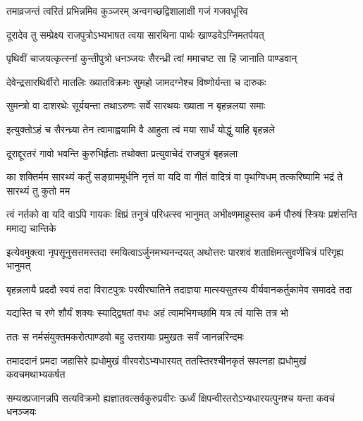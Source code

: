 \twolineshloka
{तमाव्रजन्तं त्वरितं प्रभिन्नमिव कुञ्जरम्}
{अन्वगच्छद्विशालाक्षी गजं गजवधूरिव}


\twolineshloka
{दूरादेव तु सम्प्रेक्ष्य राजपुत्रोऽभ्यभाषत}
{त्वया सारथिना पार्थः खाण्डवेऽग्निमतर्पयत्}


\twolineshloka
{पृथिवीं चाजयत्कृत्स्नां कुन्तीपुत्रो धनञ्जयः}
{सैरन्ध्री त्वां ममाचष्ट सा हि जानाति पाण्डवान्}


\twolineshloka
{देवेन्द्रसारथिर्वीरो मातलिः ख्यातविक्रमः}
{सुमहो जामदग्नेश्च विष्णोर्यन्ता च दारुकः}


\twolineshloka
{सुमन्त्रो वा दाशरथेः सूर्ययन्ता तथाऽरुणः}
{सर्वे सारथयः ख्याता न बृहन्नलया समाः}


\twolineshloka
{इत्युक्तोऽहं च सैरन्ध्र्या तेन त्वामाह्वयामि वै}
{आहुता त्वं मया सार्धं योद्धुं याहि बृहन्नले}


\twolineshloka
{दूराद्दूरतरं गावो भवन्ति कुरुभिर्हृताः}
{तथोक्ता प्रत्युवाचेदं राजपुत्रं बृहन्नला}


\threelineshloka
{का शक्तिर्मम सारथ्यं कर्तुं सङ्ग्राममूर्धनि}
{नृत्तं वा यदि वा गीतं वादित्रं वा पृथग्विधम्}
{तत्करिष्यामि भद्रं ते सारथ्यं तु कुतो मम}




\twolineshloka
{त्वं नर्तको वा यदि वाऽपि गायकः क्षिप्रं तनुत्रं परिधत्स्व भानुमत्}
{अभीक्ष्णमाहुस्तव कर्म पौरुषं स्त्रियः प्रशंसन्ति ममाद्य चान्तिके}



\twolineshloka
{इत्येवमुक्त्वा नृपसूनुसत्तमस्तदा स्मयित्वाऽर्जुनमभ्यनन्दयत्}
{अथोत्तरः पारशवं शताक्षिमत्सुवर्णचित्रं परिगृह्य भानुमत्}


\twolineshloka
{बृहन्नलायै प्रददौ स्वयं तदा विराटपुत्रः परवीरघातिने}
{तदाज्ञया मात्स्यसुतस्य वीर्यवानकर्तुकामेव समाददे तदा}




\twolineshloka
{यद्यस्ति च रणे शौर्यं शक्यः स्याद्द्विषतां वधः}
{अहं त्वामभिगच्छामि यत्र त्वं यासि तत्र भो}



\twolineshloka
{ततः स नर्मसंयुक्तमकरोत्पाण्डवो बहु}
{उत्तरायाः प्रमुखतः सर्वं जानन्नरिन्दमः}


\twolineshloka
{तमाददानं प्रमदा जहासिरे ह्यधोमुखं वीरवरोऽभ्यधारयत्}
{ततस्तिरश्चीनकृतं सपत्नहा ह्यधोमुखं कवचमथाभ्यकर्षत}


\twolineshloka
{सम्यक्प्रजानन्नपि सत्यविक्रमो ह्यज्ञातवत्सर्वकुरुप्रवीरः}
{ऊर्ध्वं क्षिपन्वीरतरोऽभ्यधारयत्पुनश्च यन्ता कवचं धनञ्जयः}


